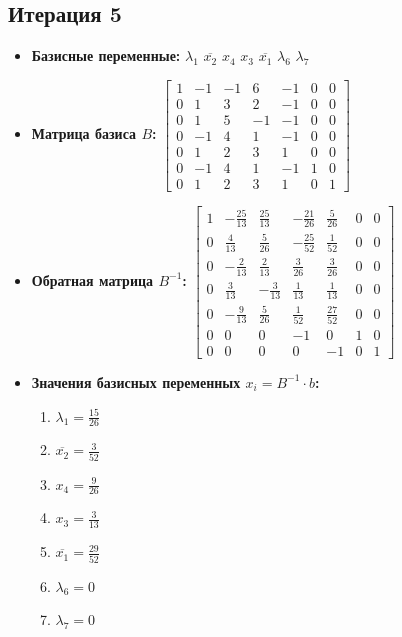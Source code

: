 \begin{itemize}
\subsection*{Итерация 5}
\begin{itemize}
\item \textbf{Базисные переменные:}
$\lambda_1$
$\overline{x_2}$
$x_4$
$x_3$
$\overline{x_1}$
$\lambda_6$
$\lambda_7$
\item \textbf{Матрица базиса $B$:}
$\left[\begin{matrix}1 & -1 & -1 & 6 & -1 & 0 & 0\\0 & 1 & 3 & 2 & -1 & 0 & 0\\0 & 1 & 5 & -1 & -1 & 0 & 0\\0 & -1 & 4 & 1 & -1 & 0 & 0\\0 & 1 & 2 & 3 & 1 & 0 & 0\\0 & -1 & 4 & 1 & -1 & 1 & 0\\0 & 1 & 2 & 3 & 1 & 0 & 1\end{matrix}\right]$
\item \textbf{Обратная матрица $B^{-1}$:}
$\left[\begin{matrix}1 & - \frac{25}{13} & \frac{25}{13} & - \frac{21}{26} & \frac{5}{26} & 0 & 0\\0 & \frac{4}{13} & \frac{5}{26} & - \frac{25}{52} & \frac{1}{52} & 0 & 0\\0 & - \frac{2}{13} & \frac{2}{13} & \frac{3}{26} & \frac{3}{26} & 0 & 0\\0 & \frac{3}{13} & - \frac{3}{13} & \frac{1}{13} & \frac{1}{13} & 0 & 0\\0 & - \frac{9}{13} & \frac{5}{26} & \frac{1}{52} & \frac{27}{52} & 0 & 0\\0 & 0 & 0 & -1 & 0 & 1 & 0\\0 & 0 & 0 & 0 & -1 & 0 & 1\end{matrix}\right]$
\item \textbf{Значения базисных переменных $ x_i = B^{-1} \cdot b$:}
\begin{enumerate}
\item $\lambda_1 = \frac{15}{26}$
\item $\overline{x_2} = \frac{3}{52}$
\item $x_4 = \frac{9}{26}$
\item $x_3 = \frac{3}{13}$
\item $\overline{x_1} = \frac{29}{52}$
\item $\lambda_6 = 0$
\item $\lambda_7 = 0$
\end{enumerate}

\end{itemize}
\end{itemize}
